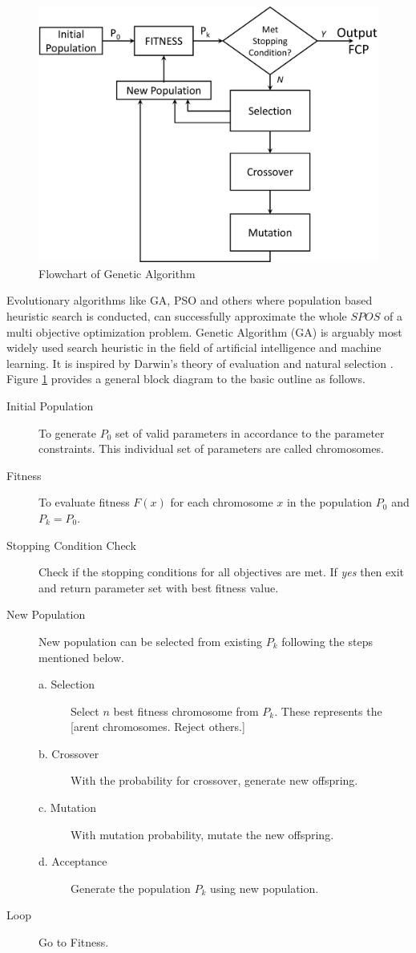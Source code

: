 \begin{figure}[h!]
	\centering
	\includegraphics[width=0.9\linewidth]{Chapter5/chapter5/Fig12_GA_Flow}
	\caption{Flowchart of Genetic Algorithm}
	\label{fig:Fig12_GA_Flow}
\end{figure}
Evolutionary algorithms like GA, PSO and others where population based heuristic search is conducted, can successfully approximate the whole $ SPOS $ of a multi objective optimization problem. Genetic Algorithm (GA) is arguably most widely used search heuristic in the field of artificial intelligence and machine learning. It is inspired by Darwin's theory of evaluation and natural selection \cite{Whitley1994}. Figure \ref{fig:Fig12_GA_Flow} provides a general block diagram to the basic outline as follows.
\begin{description}
	\item[Initial Population] To generate $ P_0 $ set of valid parameters in accordance to the parameter constraints. This individual set of parameters are called chromosomes.
	\item[Fitness] To evaluate fitness $ F(x) $ for each chromosome $ x $ in the population $ P_0 $ and $ P_k = P_0 $.
	\item[Stopping Condition Check] Check if the stopping conditions for all objectives are met. If \textit{yes} then exit and return parameter set with best fitness value.
	\item[New Population] New population can be selected from existing $P_k$ following the steps mentioned below.
	\begin{description}
		\item[a. Selection] Select $n$ best fitness chromosome from $ P_k $. These represents the [arent chromosomes. Reject others.]
		\item[b. Crossover] With the probability for crossover, generate new offspring.
		\item[c. Mutation] With mutation probability, mutate the new offspring.
		\item[d. Acceptance] Generate the population $ P_k $ using new population.
	\end{description}
	\item[Loop] Go to Fitness.
\end{description}  

